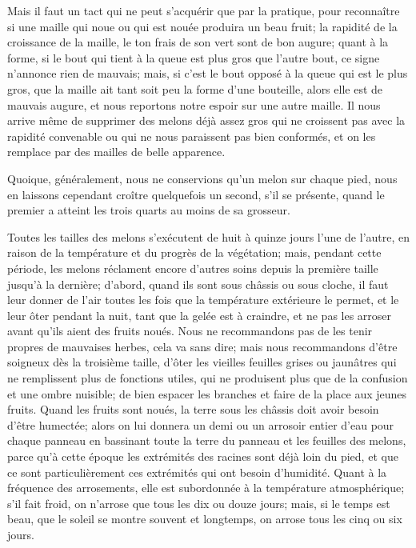 \documentclass[10pt,a4paper]{book}
\begin{document}
Mais il faut un tact qui ne peut s'acquérir que par la pratique, pour reconnaître si une maille qui noue ou qui est nouée produira un beau fruit; la rapidité de la croissance de la maille, le ton frais de son vert sont de bon augure; quant à la forme, si le bout qui tient à la queue est plus gros que l'autre bout, ce signe n'annonce rien de mauvais; mais, si c'est le bout opposé à la queue qui est le plus gros, que la maille ait tant soit peu la forme d'une bouteille, alors elle est de mauvais augure, et nous reportons notre espoir sur une autre maille. Il nous arrive même de supprimer des melons déjà assez gros qui ne croissent pas avec la rapidité convenable ou qui ne nous paraissent pas bien conformés, et on les remplace par des mailles de belle apparence.

Quoique, généralement, nous ne conservions qu'un melon sur chaque pied, nous en laissons cependant croître quelquefois un second, s'il se présente, quand le premier a atteint les trois quarts au moins de sa grosseur.

Toutes les tailles des melons s'exécutent de huit à quinze jours l'une de l'autre, en raison de la température et du progrès de la végétation; mais, pendant cette période, les melons réclament encore d'autres soins depuis la première taille jusqu'à la dernière; d'abord, quand ils sont sous châssis ou sous cloche, il faut leur donner de l'air toutes les fois que la température extérieure le permet, et le leur ôter pendant la nuit, tant que la gelée est à craindre, et ne pas les arroser avant qu'ils aient des fruits noués. Nous ne recommandons pas de les tenir propres de mauvaises herbes, cela va sans dire; mais nous recommandons d'être soigneux dès la troisième taille, d'ôter les vieilles feuilles grises ou jaunâtres qui ne remplissent plus de fonctions utiles, qui ne produisent plus que de la confusion et une ombre nuisible; de bien espacer les branches et faire de la place aux jeunes fruits. Quand les fruits sont noués, la terre sous les châssis doit avoir besoin d'être humectée; alors on lui donnera un demi ou un arrosoir entier d'eau pour chaque panneau en bassinant toute la terre du panneau et les feuilles des melons, parce qu'à cette époque les extrémités des racines sont déjà loin du pied, et que ce sont particulièrement ces extrémités qui ont besoin d'humidité. Quant à la fréquence des arrosements, elle est subordonnée à la température atmosphérique; s'il fait froid, on n'arrose que tous les dix ou douze jours; mais, si le temps est beau, que le soleil se montre souvent et longtemps, on arrose tous les cinq ou six jours.
\end{document}
